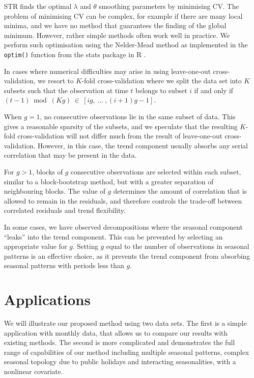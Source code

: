 \documentclass[ijds,nonblindrev]{informs-ijds}
\begin{document}
STR finds the optimal \(\lambda\) and \(\theta\) smoothing parameters by minimising CV. The problem of minimising CV can be complex, for example if there are many local minima, and we have no method that guarantees the finding of the global minimum. However, rather simple methods often work well in practice. We perform such optimisation using the Nelder-Mead method as implemented in the \texttt{optim()} function from the stats package in R \citep{R}.

In cases where numerical difficulties may arise in using leave-one-out cross-validation, we resort to \(K\)-fold cross-validation where we split the data set into \(K\) subsets such that the observation at time \(t\) belongs to subset \(i\) if and only if \((t-1) \ \operatorname{mod}\ (K g) \ \in \ [i g, \ \dots \ , (i+1)g-1]\).

When \(g = 1\), no consecutive observations lie in the same subset of data. This gives a reasonable sparsity of the subsets, and we speculate that the resulting \(K\)-fold cross-validation will not differ much from the result of leave-one-out cross-validation. However, in this case, the trend component usually absorbs any serial correlation that may be present in the data.

For \(g>1\), blocks of \(g\) consecutive observations are selected within each subset, similar to a block-bootstrap method, but with a greater separation of neighbouring blocks. The value of \(g\) determines the amount of correlation that is allowed to remain in the residuals, and therefore controls the trade-off between correlated residuals and trend flexibility.

In some cases, we have observed decompositions where the seasonal component ``leaks'' into the trend component. This can be prevented by selecting an appropriate value for \(g\). Setting \(g\) equal to the number of observations in seasonal patterns is an effective choice, as it prevents the trend component from absorbing seasonal patterns with periods less than \(g\).

\hypertarget{applications}{%
\section{Applications}\label{applications}}

We will illustrate our proposed method using two data sets. The first is a simple application with monthly data, that allows us to compare our results with existing methods. The second is more complicated and demonstrates the full range of capabilities of our method including multiple seasonal patterns, complex seasonal topology due to public holidays and interacting seasonalities, with a nonlinear covariate.
\end{document}
